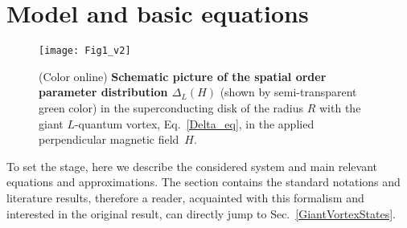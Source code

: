 \documentclass[prx,twocolumn,aps,superscriptaddress,showpacs,amsmath,amssymb,footnoteinbib]{revtex4-1}
\begin{document}
\section{Model and basic equations}\label{ModelSection}
%

\begin{figure}[t!]
\texttt{[image: Fig1\_v2]}
\caption{(Color online) \textbf{Schematic picture of the spatial
order parameter distribution $\Delta_L(H)$} (shown by semi-transparent green
color) in the superconducting disk of the radius $R$ with the
giant $L$-quantum vortex, Eq.~\eqref{Delta_eq}, in the applied
perpendicular magnetic field~$H$.
}
\label{Fig0}
\end{figure}
To set the stage, here we describe the considered system and main relevant equations and approximations.
The section contains the standard notations and literature results, therefore a reader,
acquainted with this formalism and interested in the original result, can directly jump to Sec.~\ref{GiantVortexStates}.
\end{document}
